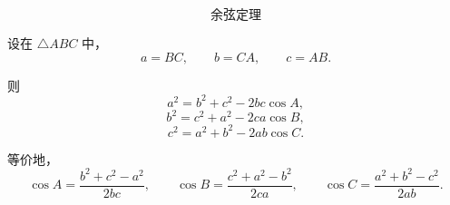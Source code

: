 \[
	\text{余弦定理}
\]

设在 \(\triangle ABC\) 中，
\[
	a=BC,\qquad b=CA,\qquad c=AB.
\]

则
\[
	a^2=b^2+c^2-2bc\cos A,
\]
\[
	b^2=c^2+a^2-2ca\cos B,
\]
\[
	c^2=a^2+b^2-2ab\cos C.
\]

等价地，
\[
	\cos A=\frac{b^2+c^2-a^2}{2bc},
	\qquad
	\cos B=\frac{c^2+a^2-b^2}{2ca},
	\qquad
	\cos C=\frac{a^2+b^2-c^2}{2ab}.
\]